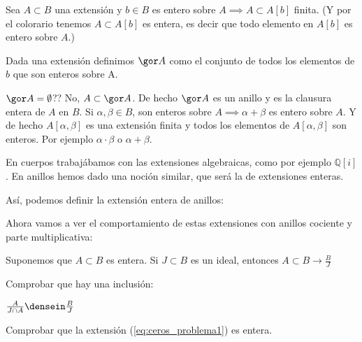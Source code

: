 \obs Sea $A \subset B$ una extensión y $b \in B$ es entero sobre $A \implies A \subset A[b]$ finita. (Y por el colorario tenemos $A\subset A[b]$ es entera, es decir que todo elemento en $A[b]$ es entero sobre $A$.)

\begin{defn}
	Dada una extensión definimos $\cls{A}$ como el conjunto de todos los elementos de $b$ que son enteros sobre A.
\end{defn}

\obs $\cls{A}=\emptyset$?? No, $A \subset \cls{A}$. De hecho $\cls{A}$ es un anillo y es la clausura entera de $A$ en $B$. Si $\alpha, \beta \in B$, son enteros sobre $A \implies \alpha + \beta$ es entero sobre $A$. Y de hecho $A[\alpha, \beta]$ es una extensión finita y todos los elementos de $A[\alpha, \beta]$ son enteros. Por ejemplo $\alpha \cdot \beta$ o $\alpha + \beta$.



	En cuerpos trabajábamos con las extensiones algebraicas, como por ejemplo $ℚ[i]$. En anillos hemos dado una noción similar, que será la de extensiones enteras.



	Así, podemos definir la extensión entera de anillos:


	Ahora vamos a ver el comportamiento de estas extensiones con anillos cociente y parte multiplicativa:

	\begin{problem}
		Suponemos que $A \subset B$ es entera.
		Si $J \subset B$ es un ideal, entonces $A \subset B \rightarrow \frac{B}{J}$

		\ppart Comprobar que hay una inclusión:

		\( \frac{A}{J \cap A} \densein \frac{B}{J} \label{eq:ceros_problema1}\)

		\ppart Comprobar que la extensión (\ref{eq:ceros_problema1}) es entera.

		\solution
	\end{problem}

